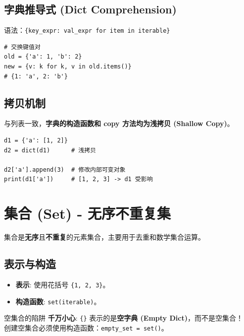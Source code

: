 \documentclass[12pt, a4paper]{article}
\begin{document}
\subsection{字典推导式 (Dict Comprehension)}

语法：\texttt{\{key\_expr: val\_expr for item in iterable\}}

\begin{lstlisting}[caption={推导式示例}]
# 交换键值对
old = {'a': 1, 'b': 2}
new = {v: k for k, v in old.items()} 
# {1: 'a', 2: 'b'}
\end{lstlisting}

\newpage

\subsection{拷贝机制}

与列表一致，\textbf{字典的构造函数和 copy 方法均为浅拷贝 (Shallow Copy)}。

\begin{lstlisting}
d1 = {'a': [1, 2]}
d2 = dict(d1)      # 浅拷贝

d2['a'].append(3)  # 修改内部可变对象
print(d1['a'])     # [1, 2, 3] -> d1 受影响
\end{lstlisting}

\section{集合 (Set) - 无序不重复集}

集合是\textbf{无序}且\textbf{不重复}的元素集合，主要用于去重和数学集合运算。

\subsection{表示与构造}

\begin{itemize}
    \item \textbf{表示}: 使用花括号 \texttt{\{1, 2, 3\}}。
    \item \textbf{构造函数}: \texttt{set(iterable)}。
\end{itemize}

\begin{trapbox}{空集合的陷阱}
\textbf{千万小心}: \texttt{\{\}} 表示的是\textbf{空字典 (Empty Dict)}，而不是空集合！
\\ 创建空集合必须使用构造函数：\texttt{empty\_set = set()}。
\end{trapbox}
\end{document}
